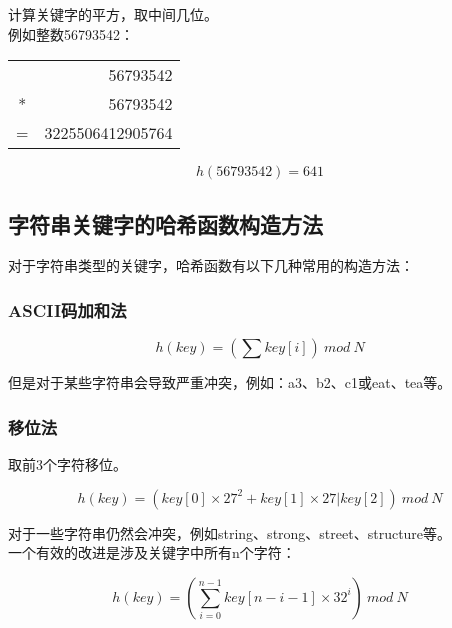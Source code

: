 计算关键字的平方，取中间几位。 \\

例如整数56793542：

\begin{table}[H]
	\centering
	\begin{tabular}{cD{.}{.}{3}}
		  & 56793542         \\
		* & 56793542         \\
		\hline
		= & 3225506412905764
	\end{tabular}
\end{table}

\vspace{-1cm}

$$
	h(56793542) = 641
$$

\subsection{字符串关键字的哈希函数构造方法}

对于字符串类型的关键字，哈希函数有以下几种常用的构造方法：

\subsubsection{ASCII码加和法}

\vspace{-0.5cm}

$$
	h(key) = \left(\sum key[i] \right)\ mod\ N
$$

但是对于某些字符串会导致严重冲突，例如：a3、b2、c1或eat、tea等。 \\

\subsubsection{移位法}

取前3个字符移位。

\vspace{-0.5cm}

$$
	h(key) = \left(key[0] \times 27^2 + key[1] \times 27 | key[2] \right)\ mod\ N
$$

对于一些字符串仍然会冲突，例如string、strong、street、structure等。 \\

一个有效的改进是涉及关键字中所有n个字符：

$$
	h(key) = \left( \sum_{i=0}^{n-1} key[n-i-1] \times 32^i \right)\ mod\ N
$$

 \\

